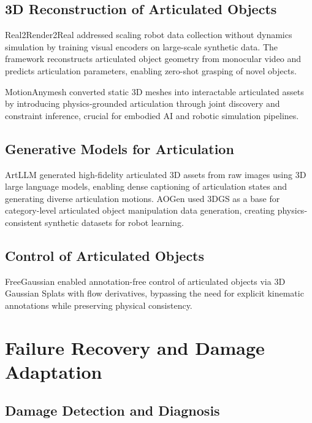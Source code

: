\documentclass[journal]{IEEEtran}
\begin{document}
\subsection{3D Reconstruction of Articulated Objects}

Real2Render2Real \cite{r2r2r2025} addressed scaling robot data collection without dynamics simulation by training visual encoders on large-scale synthetic data. The framework reconstructs articulated object geometry from monocular video and predicts articulation parameters, enabling zero-shot grasping of novel objects.

MotionAnymesh \cite{motionanymesh2026} converted static 3D meshes into interactable articulated assets by introducing physics-grounded articulation through joint discovery and constraint inference, crucial for embodied AI and robotic simulation pipelines.

\subsection{Generative Models for Articulation}

ArtLLM \cite{artllm2026} generated high-fidelity articulated 3D assets from raw images using 3D large language models, enabling dense captioning of articulation states and generating diverse articulation motions. AOGen \cite{aomgen2026} used 3DGS as a base for category-level articulated object manipulation data generation, creating physics-consistent synthetic datasets for robot learning.

\subsection{Control of Articulated Objects}

FreeGaussian \cite{freegaussian2026} enabled annotation-free control of articulated objects via 3D Gaussian Splats with flow derivatives, bypassing the need for explicit kinematic annotations while preserving physical consistency.

\section{Failure Recovery and Damage Adaptation}

\subsection{Damage Detection and Diagnosis}
\end{document}
